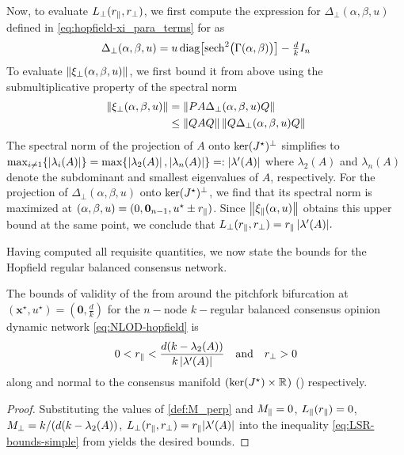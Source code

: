 \documentclass[letterpaper, 10 pt, conference]{ieeeconf}
\begin{document}
Now, to evaluate \(L_{\perp}(r_{\parallel},r_{\perp})\), we first compute the expression for \(\Delta_{\perp}(\alpha, \beta, u)\) defined in \eqref{eq:hopfield-xi_para_terms} for  as
\begin{equation*}
    \Delta_{\perp}(\alpha, \beta, u) = u \operatorname{diag}\bigl[\operatorname{sech}^2\bigl(\Gamma(\alpha,\beta)\bigr)\bigr] - \tfrac{d}{k}I_{n}
\end{equation*}
To evaluate \(\left\lVert{\ensuremath{\xi_{\perp}(\alpha,\beta,u)}}\right\rVert\), we first bound it from above using the submultiplicative property of the spectral norm
\begin{align*}
    \left\lVert{\ensuremath{\xi_{\perp}(\alpha,\beta,u)}}\right\rVert & = \left\lVert{P A \Delta_{\perp}(\alpha,\beta,u) Q}\right\rVert               \\
                    & \leq \left\lVert{Q A Q}\right\rVert \left\lVert{Q \Delta_{\perp}(\alpha,\beta,u) Q}\right\rVert
\end{align*}
The spectral norm of the projection of \(A\) onto \(\ker(J^{\star})^{\perp}\) simplifies to \(\max_{i \neq 1}\{\left\lvert{\lambda_{i}(A)}\right\rvert\} = \max\{\left\lvert{\lambda_2(A)}\right\rvert, \left\lvert{\lambda_n(A)}\right\rvert\} =: \left\lvert{\lambda'(A)}\right\rvert\) where \(\lambda_2(A)\) and \(\lambda_n(A)\) denote the subdominant and smallest eigenvalues of \(A\), respectively. For the projection of \(\Delta_{\perp}(\alpha,\beta,u)\) onto \(\ker(J^{\star})^{\perp}\), we find that its spectral norm is maximized at \((\alpha,\beta,u) = (0, \mathbf{0}_{n-1}, u^{\star} \pm r_{\parallel})\). Since \(\left\lVert{\ensuremath{\xi_{\parallel}(\alpha,u)}}\right\rVert\) obtains this upper bound at the same point, we conclude that \(L_{\perp}(r_{\parallel},r_{\perp}) = r_{\parallel}\,|\lambda'(A)|.\)

Having computed all requisite quantities, we now state the bounds for the Hopfield regular balanced consensus network.
\begin{theorem}\label{thm:NLOD-bounds}
    The bounds of validity of the \LSR{} from  around the pitchfork bifurcation at \((\mathbf{x}^{\star},u^{\star})=(\mathbf{0}, \tfrac{d}{k})\) for the \(n-\)node \(k-\)regular balanced consensus opinion dynamic network \eqref{eq:NLOD-hopfield} is
    \begin{equation*}
        0<r_{\parallel}<\frac{d(k-\lambda_{2}(A))}{k\left\lvert{\lambda'(A)}\right\rvert} \quad\text{and}\quad r_{\perp}>0
    \end{equation*}
    along and normal to the consensus manifold \((\ker(J^{\star})\times\mathbb{R}^{})\) () respectively.
\end{theorem}
\begin{proof}
    Substituting the values of \eqref{def:M_perp} and \(M_{\parallel} = 0\), \(L_{\parallel}(r_{\parallel}) = 0\), \(M_{\perp} = k/(d(k - \lambda_2(A))\), \(L_{\perp}(r_{\parallel},r_{\perp}) = r_{\parallel} |\lambda'(A)|\) into the inequality \eqref{eq:LSR-bounds-simple} from  yields the desired bounds.
\end{proof}
\end{document}
